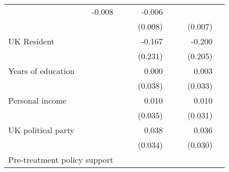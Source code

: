 \documentclass{article}
\begin{document}
\begin{table}[!h]
\begin{tabular}{llllllll}
  \multicolumn{1}{r}{-0.008} &
  \multicolumn{1}{l}{} &
  \multicolumn{1}{r}{} &
  \multicolumn{1}{r}{-0.006} &
  \multicolumn{1}{l}{} \\
\multicolumn{1}{l}{} &
  \multicolumn{1}{r}{} &
  \multicolumn{1}{l}{} &
  \multicolumn{1}{r}{(0.008)} &
  \multicolumn{1}{l}{} &
  \multicolumn{1}{r}{} &
  \multicolumn{1}{r}{(0.007)} &
  \multicolumn{1}{l}{} \\
\multicolumn{1}{l}{UK Resident} &
  \multicolumn{1}{r}{} &
  \multicolumn{1}{l}{} &
  \multicolumn{1}{r}{-0.167} &
  \multicolumn{1}{l}{} &
  \multicolumn{1}{r}{} &
  \multicolumn{1}{r}{-0.200} &
  \multicolumn{1}{l}{} \\
\multicolumn{1}{l}{} &
  \multicolumn{1}{r}{} &
  \multicolumn{1}{l}{} &
  \multicolumn{1}{r}{(0.231)} &
  \multicolumn{1}{l}{} &
  \multicolumn{1}{r}{} &
  \multicolumn{1}{r}{(0.205)} &
  \multicolumn{1}{l}{} \\
\multicolumn{1}{l}{Years of education} &
  \multicolumn{1}{r}{} &
  \multicolumn{1}{l}{} &
  \multicolumn{1}{r}{0.000} &
  \multicolumn{1}{l}{} &
  \multicolumn{1}{r}{} &
  \multicolumn{1}{r}{0.003} &
  \multicolumn{1}{l}{} \\
\multicolumn{1}{l}{} &
  \multicolumn{1}{r}{} &
  \multicolumn{1}{l}{} &
  \multicolumn{1}{r}{(0.038)} &
  \multicolumn{1}{l}{} &
  \multicolumn{1}{r}{} &
  \multicolumn{1}{r}{(0.033)} &
  \multicolumn{1}{l}{} \\
\multicolumn{1}{l}{Personal income} &
  \multicolumn{1}{r}{} &
  \multicolumn{1}{l}{} &
  \multicolumn{1}{r}{0.010} &
  \multicolumn{1}{l}{} &
  \multicolumn{1}{r}{} &
  \multicolumn{1}{r}{0.010} &
  \multicolumn{1}{l}{} \\
\multicolumn{1}{l}{} &
  \multicolumn{1}{r}{} &
  \multicolumn{1}{l}{} &
  \multicolumn{1}{r}{(0.035)} &
  \multicolumn{1}{l}{} &
  \multicolumn{1}{r}{} &
  \multicolumn{1}{r}{(0.031)} &
  \multicolumn{1}{l}{} \\
\multicolumn{1}{l}{UK political party} &
  \multicolumn{1}{r}{} &
  \multicolumn{1}{l}{} &
  \multicolumn{1}{r}{0.038} &
  \multicolumn{1}{l}{} &
  \multicolumn{1}{r}{} &
  \multicolumn{1}{r}{0.036} &
  \multicolumn{1}{l}{} \\
\multicolumn{1}{l}{} &
  \multicolumn{1}{r}{} &
  \multicolumn{1}{l}{} &
  \multicolumn{1}{r}{(0.034)} &
  \multicolumn{1}{l}{} &
  \multicolumn{1}{r}{} &
  \multicolumn{1}{r}{(0.030)} &
  \multicolumn{1}{l}{} \\
\multicolumn{1}{l}{Pre-treatment policy support} &
  \multicolumn{1}{r}{} &
  \multicolumn{1}{l}{} &

\end{tabular}
\end{table}
\end{document}
